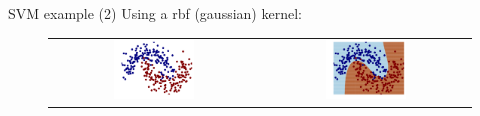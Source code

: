 \begin{frame}{SVM example (2)}
Using a rbf (gaussian) kernel:
\begin{figure}
\begin{tabular}{cc}
\includegraphics[width=0.4\textwidth]{img/svm/rbf_kernel_21.pdf}&
\includegraphics[width=0.4\textwidth]{img/svm/rbf_kernel_22.pdf}
\end{tabular}
\end{figure}
\end{frame}